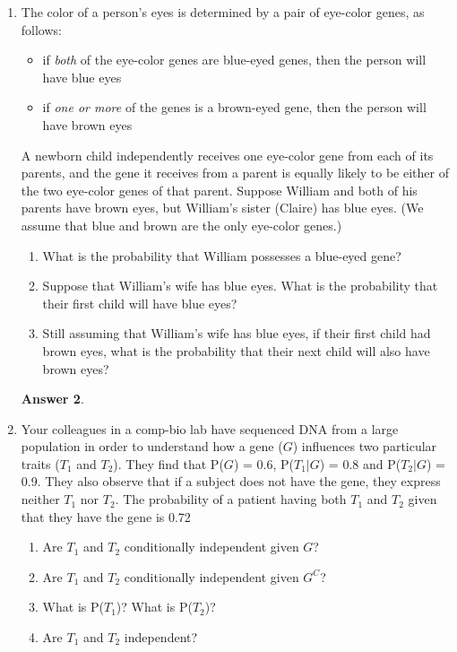 \documentclass[12pt]{article}
\renewcommand{\(}{\left(}
\renewcommand{\)}{\right)}
\theoremstyle{definition}
\newtheorem*{answer}{Answer}
\begin{document}
\begin{enumerate}
\begin{shaded}
\begin{answer}
    \end{answer}
    \end{shaded}
    \pagebreak
    \textbf{DNA}
    \item The color of a person's eyes is determined by a pair of eye-color genes, as follows:
    \begin{itemize}
    \item if \textit{both} of the eye-color genes are blue-eyed genes, then the person will have blue eyes
    \item if \textit{one or more} of the genes is a brown-eyed gene, then the person will have brown eyes
    \end{itemize}
    A newborn child independently receives one eye-color gene from each of its parents, and the gene it receives from a parent is equally likely to be either of the two eye-color genes of that parent. Suppose William and both of his parents have brown eyes, but William's sister (Claire) has blue eyes. (We assume that blue and brown are the only eye-color genes.)
    \begin{enumerate}
        \item What is the probability that William possesses a blue-eyed gene?
        \item Suppose that William's wife has blue eyes. What is the probability that their first child will have blue eyes?
        \item Still assuming that William's wife has blue eyes, if their first child had brown eyes, what is the probability that their next child will also have brown eyes?
    \end{enumerate}
    
    \begin{shaded}
    \begin{answer}
    
    \end{answer}
    \end{shaded}
    \pagebreak
    \item Your colleagues in a comp-bio lab have sequenced DNA from a large population in order to understand how a gene ($G$) influences two particular traits ($T_1$ and $T_2$). They find that P($G$) = 0.6, P($T_1|G$) = 0.8 and P($T_2|G$) = 0.9. They also observe that if a subject does not have the gene, they express neither $T_1$ nor $T_2$. The probability of a patient having both $T_1$ and $T_2$ given that they have the gene is 0.72
    \begin{enumerate}
        \item Are $T_1$ and $T_2$ conditionally independent given $G$?
        \item Are $T_1$ and $T_2$ conditionally independent given $G^C$?
        \item What is P($T_1$)? What is P($T_2$)?
        \item Are $T_1$ and $T_2$ independent?
    \end{enumerate}
    

\end{enumerate}
\end{document}
